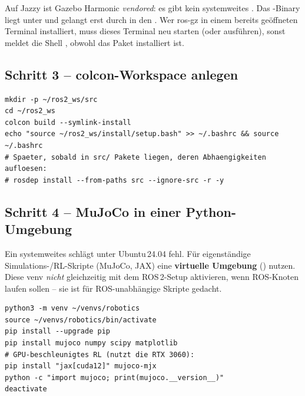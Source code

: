 \begin{warnbox}[title=\code{gz: command not found}? ROS\,2 sourcen]
Auf Jazzy ist Gazebo Harmonic \emph{vendored}: es gibt kein systemweites
. Das -Binary liegt unter
 und gelangt erst durch
 in den . Wer ros-gz in einem
bereits geöffneten Terminal installiert, muss dieses Terminal neu starten (oder
 ausführen), sonst meldet die Shell
, obwohl das Paket installiert ist.
\end{warnbox}

\subsection{Schritt 3 -- colcon-Workspace anlegen}
\begin{lstlisting}[style=bash,caption={Eigener Arbeits-Workspace für die Projekt-Pakete}]
mkdir -p ~/ros2_ws/src
cd ~/ros2_ws
colcon build --symlink-install
echo "source ~/ros2_ws/install/setup.bash" >> ~/.bashrc && source ~/.bashrc
# Spaeter, sobald in src/ Pakete liegen, deren Abhaengigkeiten aufloesen:
# rosdep install --from-paths src --ignore-src -r -y
\end{lstlisting}

\subsection{Schritt 4 -- MuJoCo in einer Python-Umgebung}
\begin{warnbox}[title=Ubuntu 24.04 ist ``externally managed'' (PEP 668)]
Ein systemweites  schlägt unter Ubuntu\,24.04 fehl. Für
eigenständige Simulations-/RL-Skripte (MuJoCo, JAX) eine \textbf{virtuelle
Umgebung} () nutzen. Diese venv \emph{nicht} gleichzeitig mit dem
ROS\,2-Setup aktivieren, wenn ROS-Knoten laufen sollen -- sie ist für
ROS-unabhängige Skripte gedacht.
\end{warnbox}
\begin{lstlisting}[style=bash,caption={MuJoCo und der GPU-Pfad MJX}]
python3 -m venv ~/venvs/robotics
source ~/venvs/robotics/bin/activate
pip install --upgrade pip
pip install mujoco numpy scipy matplotlib
# GPU-beschleunigtes RL (nutzt die RTX 3060):
pip install "jax[cuda12]" mujoco-mjx
python -c "import mujoco; print(mujoco.__version__)"
deactivate
\end{lstlisting}

